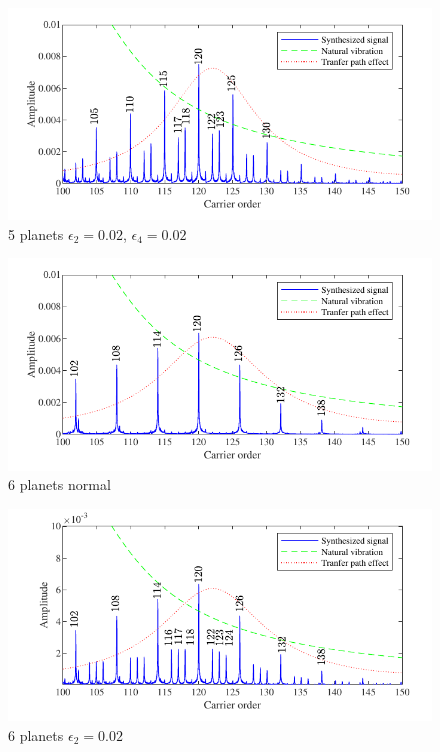 \documentclass[a4paper,fleqn]{cas-sc}%
\begin{document}
\begin{figure}[pos=htbp]
    \centering
    \includegraphics[scale=1]{Figures/5_planet_2_th_0_01_4_th_0_02_fourier.pdf}
    \caption{5 planets $\epsilon_2=0.02$\degree, $\epsilon_4=0.02$\degree}
    \label{fig:5_planet_2_th_0_01_4_th_0_02_fourier}
\end{figure}
\begin{figure}[pos=htbp]
    \centering
    \includegraphics[scale=1]{Figures/6_planet_normal_fourier.pdf}
    \caption{6 planets normal}
    \label{fig:6_planet_normal_fourier}
\end{figure}
\begin{figure}[pos=htbp]
    \centering
    \includegraphics[scale=1]{Figures/6_planet_2_th_0_02_fourier.pdf}
    \caption{6 planets $\epsilon_2=0.02$\degree}
    \label{fig:6_planet_2_th_0_02_fourier}
\end{figure}
\end{document}

